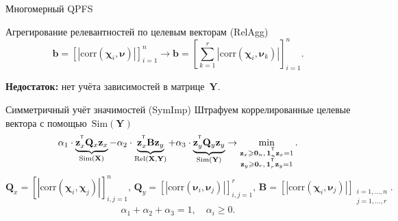 \documentclass[9pt]{beamer}
\renewcommand{\geq}{\ensuremath{\geqslant}}
\newcommand{\bb}{\mathbf{b}}
\newcommand{\bz}{\mathbf{z}}
\newcommand{\bB}{\mathbf{B}}
\newcommand{\bQ}{\mathbf{Q}}
\newcommand{\bX}{\mathbf{X}}
\newcommand{\bY}{\mathbf{Y}}
\newcommand{\bchi}{\boldsymbol{\chi}}
\newcommand{\bnu}{\boldsymbol{\nu}}
\newcommand{\T}{^{\text{\tiny\sffamily\upshape\mdseries T}}}
\newcommand{\bOne}{\boldsymbol{1}}
\newcommand{\bZero}{\boldsymbol{0}}
\begin{document}
\begin{frame}{Многомерный QPFS}
\begin{block}{Агрегирование релевантностей по целевым векторам (RelAgg)}
\[
\bb = \left[\left|\text{corr}(\bchi_i, \bnu)\right|\right]_{i=1}^n \rightarrow \bb = \left[\sum_{k=1}^r\left|\text{corr}(\bchi_i, \bnu_k)\right|\right]_{i=1}^n.
\]
\end{block}
{\bf Недостаток:} нет учёта зависимостей в матрице~$\bY$. 

\begin{block}{Симметричный учёт значимостей (SymImp)}
Штрафуем коррелированные целевые вектора с помощью~$\text{Sim} (\bY)$
\[
\alpha_1 \cdot \underbrace{\bz_x^{\T} \bQ_x \bz_x}_{\text{Sim}(\bX)} - \alpha_2 \cdot \underbrace{\bz_x^{\T} \bB \bz_y}_{\text{Rel}(\bX, \bY)} + \alpha_3 \cdot \underbrace{\bz_y^{\T} \bQ_y \bz_y}_{\text{Sim}(\bY)} \rightarrow \min_{\substack{\bz_x \geq \bZero_n, \, \bOne_n^{\T}\bz_x=1 \\ \bz_y \geq \bZero_r, \, \bOne_r^{\T}\bz_y=1}}.
\]
\[
\bQ_x = \left[ \left| \text{corr}(\bchi_i, \bchi_j) \right| \right]_{i,j=1}^n, \,
\bQ_y = \left[ \left| \text{corr}(\bnu_i, \bnu_j) \right| \right]_{i,j=1}^r, \,
\bB =  \left[ \left| \text{corr}(\bchi_i, \bnu_j) \right| \right]_{\substack{i=1, \dots, n \\ j=1, \dots, r}}.
\]
\[
\alpha_1 + \alpha_2 + \alpha_3 = 1, \quad \alpha_i \geq 0.
\] 
\end{block}
\end{frame}
\end{document}
